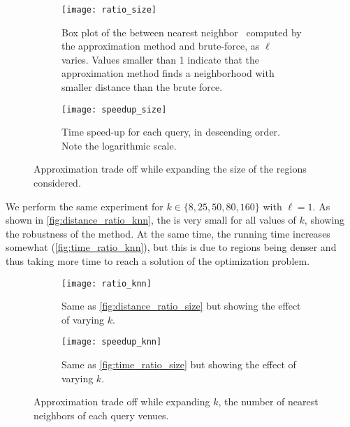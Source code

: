 \begin{figure}[t]
    \begin{subfigure}[b]{\linewidth}
        \centering
        \texttt{[image: ratio\_size]}
		\caption[\Dratio{} as $\ell$ increases]{Box plot of the \Dratio{} between
          nearest neighbor \emd\ computed by the approximation
          method and brute-force, as $\ell$ varies.
          Values smaller than 1 indicate that the approximation method
          finds a neighborhood with smaller distance than the brute force. 
	\label{fig:distance_ratio_size}}
    \end{subfigure}

    \begin{subfigure}[b]{\linewidth}
        \centering
        \texttt{[image: speedup\_size]}
	\caption[Time speed-up as $\ell$ increases]{Time speed-up for each query, in
          descending order. Note the logarithmic scale.\label{fig:time_ratio_size}}
    \end{subfigure}
    \caption{Approximation trade off while expanding the size of the regions considered.\label{fig:approx_by_size}}
\end{figure}

We perform the same experiment for $k \in \{8, 25, 50, 80, 160\}$ with
$\ell=1$.  As shown in \autoref{fig:distance_ratio_knn}, the \Dratio{} is very
small for all values of $k$, showing the robustness of the method.  At the same
time, the running time increases somewhat (\autoref{fig:time_ratio_knn}), but
this is due to regions being denser and thus \emd{} taking more time to reach a
solution of the optimization problem.

\begin{figure}[t]
        \centering
    \begin{subfigure}[b]{\linewidth}
        \texttt{[image: ratio\_knn]}
		\caption[\Dratio{} as $k$ increases]{Same as
			\autoref{fig:distance_ratio_size} but showing the effect of varying
			$k$.  \label{fig:distance_ratio_knn}}
    \end{subfigure}

    \begin{subfigure}[b]{\linewidth}
        \centering
        \texttt{[image: speedup\_knn]}
	\caption[Time speed-up as $k$ increases]{Same as
			\autoref{fig:time_ratio_size} but showing the effect of varying
			$k$.\label{fig:time_ratio_knn}}
    \end{subfigure}
    \caption{Approximation trade off while expanding $k$, the number of nearest
	neighbors of each query venues.\label{fig:approx_by_knn}}
\end{figure}

